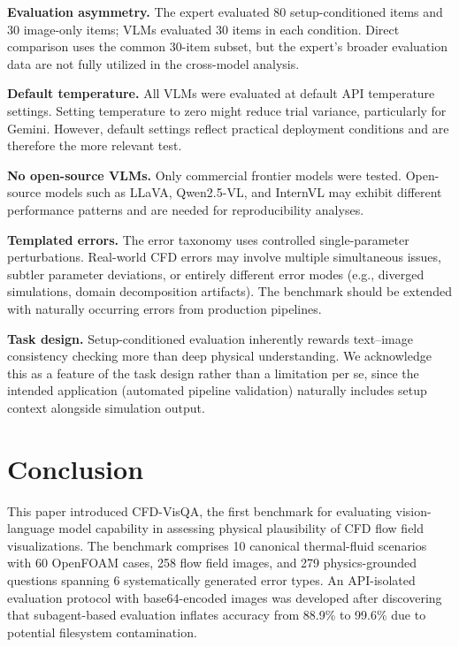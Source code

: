 \documentclass[preprint,12pt]{elsarticle}
\begin{document}
\textbf{Evaluation asymmetry.} The expert evaluated 80 setup-conditioned
items and 30 image-only items; VLMs evaluated 30 items in each condition.
Direct comparison uses the common 30-item subset, but the expert's broader
evaluation data are not fully utilized in the cross-model analysis.

\textbf{Default temperature.} All VLMs were evaluated at default API
temperature settings. Setting temperature to zero might reduce trial variance,
particularly for Gemini. However, default settings reflect practical
deployment conditions and are therefore the more relevant test.

\textbf{No open-source VLMs.} Only commercial frontier models were tested.
Open-source models such as LLaVA, Qwen2.5-VL, and InternVL may exhibit
different performance patterns and are needed for reproducibility analyses.

\textbf{Templated errors.} The error taxonomy uses controlled single-parameter
perturbations. Real-world CFD errors may involve multiple simultaneous issues,
subtler parameter deviations, or entirely different error modes (e.g.,
diverged simulations, domain decomposition artifacts). The benchmark should be
extended with naturally occurring errors from production pipelines.

\textbf{Task design.} Setup-conditioned evaluation inherently rewards
text--image consistency checking more than deep physical understanding. We
acknowledge this as a feature of the task design rather than a limitation per
se, since the intended application (automated pipeline validation) naturally
includes setup context alongside simulation output.


\section{Conclusion}
\label{sec:conclusion}

This paper introduced CFD-VisQA, the first benchmark for evaluating
vision-language model capability in assessing physical plausibility of CFD
flow field visualizations. The benchmark comprises 10 canonical thermal-fluid
scenarios with 60 OpenFOAM cases, 258 flow field images, and 279
physics-grounded questions spanning 6 systematically generated error types.
An API-isolated evaluation protocol with base64-encoded images was developed
after discovering that subagent-based evaluation inflates accuracy from
88.9\% to 99.6\% due to potential filesystem contamination.
\end{document}
